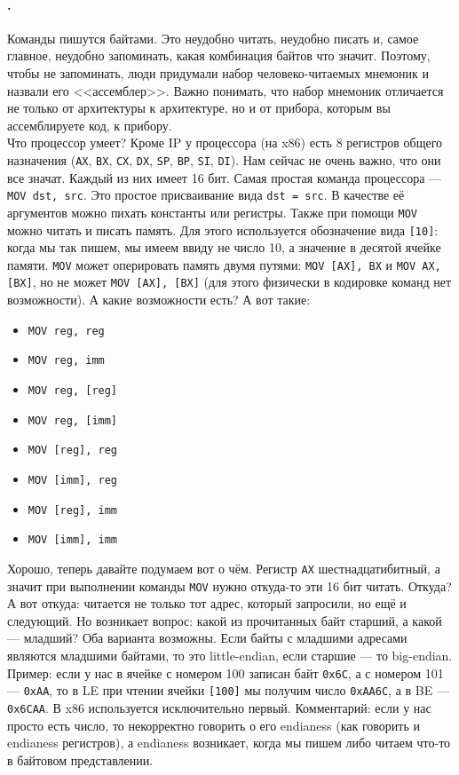 \documentclass{article}
\newcommand{\asm}[1]{\texttt{#1}}
\begin{document}
    \paragraph{.}
    Команды пишутся байтами. Это неудобно читать, неудобно писать и, самое главное, неудобно запоминать, какая комбинация байтов что значит. Поэтому, чтобы не запоминать, люди придумали набор человеко-читаемых мнемоник и назвали его <<ассемблер>>. Важно понимать, что набор мнемоник отличается не только от архитектуры к архитектуре, но и от прибора, которым вы ассемблируете код, к прибору.\\
    Что процессор умеет? Кроме IP у процессора (на x86) есть 8 регистров общего назначения (\asm{AX}, \asm{BX}, \asm{CX}, \asm{DX}, \asm{SP}, \asm{BP}, \asm{SI}, \asm{DI}). Нам сейчас не очень важно, что они все значат. Каждый из них имеет 16 бит. Самая простая команда процессора --- \asm{MOV dst, src}. Это простое присваивание вида \texttt{dst = src}. В качестве её аргументов можно пихать константы или регистры. Также при помощи \asm{MOV} можно читать и писать память. Для этого используется обозначение вида \asm{[10]}: когда мы так пишем, мы имеем ввиду не число 10, а значение в десятой ячейке памяти. \asm{MOV} может оперировать память двумя путями: \asm{MOV [AX], BX} и \asm{MOV AX, [BX]}, но не может \asm{MOV [AX], [BX]} (для этого физически в кодировке команд нет возможности). А какие возможности есть? А вот такие:
    \begin{itemize}
        \item \asm{MOV reg, reg}
        \item \asm{MOV reg, imm}
        \item \asm{MOV reg, [reg]}
        \item \asm{MOV reg, [imm]}
        \item \asm{MOV [reg], reg}
        \item \asm{MOV [imm], reg}
        \item \asm{MOV [reg], imm}
        \item \asm{MOV [imm], imm}
    \end{itemize}
    Хорошо, теперь давайте подумаем вот о чём. Регистр \asm{AX} шестнадцатибитный, а значит при выполнении команды \asm{MOV} нужно откуда-то эти 16 бит читать. Откуда? А вот откуда: читается не только тот адрес, который запросили, но ещё и следующий. Но возникает вопрос: какой из прочитанных байт старший, а какой --- младший? Оба варианта возможны. Если байты с младшими адресами являются младшими байтами, то это little-endian, если старшие --- то big-endian. Пример: если у нас в ячейке с номером 100 записан байт \texttt{0x6C}, а с номером 101 --- \texttt{0xAA}, то в LE при чтении ячейки \asm{[100]} мы получим число \texttt{0xAA6C}, а в BE --- \texttt{0x6CAA}. В x86 используется исключительно первый. Комментарий: если у нас просто есть число, то некорректно говорить о его endianess (как говорить и endianess регистров), а endianess возникает, когда мы пишем либо читаем что-то в байтовом представлении.\\
\end{document}
